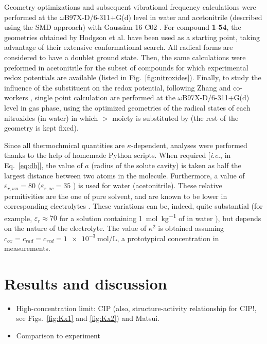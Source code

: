 \documentclass[review]{elsarticle}
\begin{document}
Geometry optimizations and subsequent vibrational frequency calculations were performed at the $\omega$B97X-D/6-311+G(d) level in water and acetonitrile (described using the SMD \cite{marenichUniversalSolvationModel2009} approach) with Gaussian 16 C02 \cite{g16}. For compound \textbf{1}-\textbf{54}, the geometries obtained by Hodgson et al. \cite{hodgsonOneElectronOxidationReduction2007} have been used as a starting point, taking advantage of their extensive conformational search. All radical forms are considered to have a doublet ground state. Then, the same calculations were preformed in acetonitrile for the subset of compounds for which experimental redox potentials are available (listed in Fig.~\ref{fig:nitroxides}). Finally, to study the influence of the substituent on the redox potential, following Zhang and co-workers \cite{zhangEffectHeteroatomFunctionality2018}, single point calculation are performed at the $\omega$B97X-D/6-311+G(d) level in gas phase, using the optimized geometries of  the radical states of each nitroxides (in water) in which $>$ moiety is substituted by  (the rest of the geometry is kept fixed).

Since all thermochmical quantities are $\kappa$-dependent, analyses were performed thanks to the help of homemade Python scripts. When required [\textit{i.e.}, in Eq.~\eqref{eq:dh}], the value of $a$ (radius of the solute cavity) is taken as half the largest distance between two atoms in the molecule. Furthermore, a value of $\varepsilon_{r,wa}=80$ ($\varepsilon_{r,ac}=35$ ) is used for water (acetonitrile). These relative permitivities are the one of pure solvent, and are known to be lower in corresponding electrolytes \cite{silvaTrueHuckelEquation2022}. These variations can be, indeed, quite substantial (for example, $\varepsilon_r\approx 70$ for a solution containing \SI{1}{\mol\per\kilo\gram} of  in water \cite{kontogeorgisDebyeHuckelTheoryIts2018,silvaTrueHuckelEquation2022}), but depends on the nature of the electrolyte.
The value of $\kappa^2$ is obtained assuming  $c_{ox} = c_{rad} = c_ {red} = \SI{1e-3}{\mole\per\liter}$, a prototypical concentration in measurements.

\clearpage

\section{Results and discussion}

\begin{itemize}
	\item High-concentration limit: CIP (also, structure-activity relationship for CIP!, see Figs.~\ref{fig:Kx1} and \ref{fig:Kx2}) and Matsui.
	\item Comparison to experiment
\end{itemize}
\end{document}
